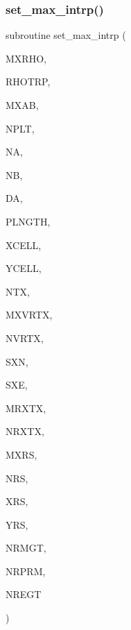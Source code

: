 \subsubsection{\texorpdfstring{set\+\_\+max\+\_\+intrp()}{set\_max\_intrp()}}
{\footnotesize\ttfamily subroutine set\+\_\+max\+\_\+intrp (\begin{DoxyParamCaption}\item[{integer}]{M\+X\+R\+HO,  }\item[{real, dimension(mxrho)}]{R\+H\+O\+T\+RP,  }\item[{integer}]{M\+X\+AB,  }\item[{integer}]{N\+P\+LT,  }\item[{integer, dimension(nplt)}]{NA,  }\item[{integer, dimension(nplt)}]{NB,  }\item[{real, dimension(nplt)}]{DA,  }\item[{real, dimension(nplt)}]{P\+L\+N\+G\+TH,  }\item[{real, dimension(mxab,nplt)}]{X\+C\+E\+LL,  }\item[{real, dimension(mxab,nplt)}]{Y\+C\+E\+LL,  }\item[{integer}]{N\+TX,  }\item[{integer}]{M\+X\+V\+R\+TX,  }\item[{integer, dimension(ntx)}]{N\+V\+R\+TX,  }\item[{real, dimension(mxvrtx,ntx)}]{S\+XN,  }\item[{real, dimension(mxvrtx,ntx)}]{S\+XE,  }\item[{integer}]{M\+R\+X\+TX,  }\item[{integer, dimension(ntx)}]{N\+R\+X\+TX,  }\item[{integer}]{M\+X\+RS,  }\item[{integer, dimension(mrxtx,ntx)}]{N\+RS,  }\item[{real, dimension (mxrs,mrxtx,ntx)}]{X\+RS,  }\item[{real, dimension (mxrs,mrxtx,ntx)}]{Y\+RS,  }\item[{integer}]{N\+R\+M\+GT,  }\item[{integer}]{N\+R\+P\+RM,  }\item[{integer}]{N\+R\+E\+GT }\end{DoxyParamCaption})}

\mbox{\label{Leroi__c_8f90_a820f6bd31435032872330d97a6fdf404}} 
